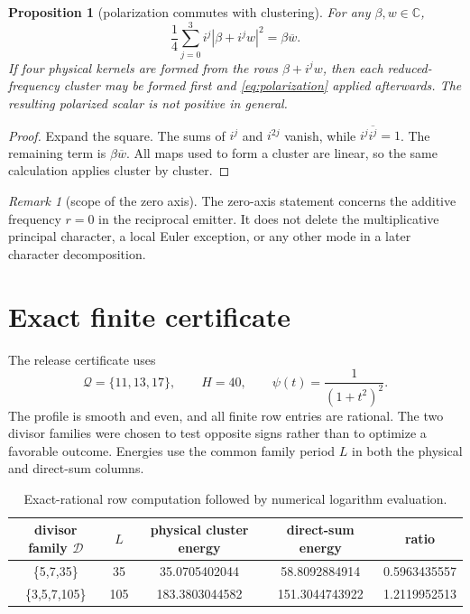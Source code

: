 \documentclass[11pt]{article}
\newtheorem{proposition}[theorem]{Proposition}
\theoremstyle{definition}
\theoremstyle{remark}
\newtheorem{remark}[theorem]{Remark}
\newcommand{\CC}{\mathbb C}
\newcommand{\Dd}{\mathcal D}
\newcommand{\QQ}{\mathcal Q}
\begin{document}
\begin{proposition}[polarization commutes with clustering]
\label{prop:polarization}
For any $\beta,w\in\CC$,
\begin{equation}
 \frac14\sum_{j=0}^3 i^j|\beta+i^jw|^2=\beta\overline w.
 \label{eq:polarization}
\end{equation}
If four physical kernels are formed from the rows
$\beta+i^jw$, then each reduced-frequency cluster may be formed first and
\eqref{eq:polarization} applied afterwards.  The resulting polarized scalar is
not positive in general.
\end{proposition}

\begin{proof}
Expand the square.  The sums of $i^j$ and $i^{2j}$ vanish, while
$i^j\overline{i^j}=1$.  The remaining term is $\beta\overline w$.  All maps
used to form a cluster are linear, so the same calculation applies cluster by
cluster.
\end{proof}

\begin{remark}[scope of the zero axis]
The zero-axis statement concerns the additive frequency $r=0$ in the reciprocal
emitter.  It does not delete the multiplicative principal character, a local
Euler exception, or any other mode in a later character decomposition.
\end{remark}

\section{Exact finite certificate}

The release certificate uses
\begin{equation}
 \QQ=\{11,13,17\},\qquad H=40,
 \qquad \psi(t)=\frac{1}{(1+t^2)^2}.
 \label{eq:fixture}
\end{equation}
The profile is smooth and even, and all finite row entries are rational.  The
two divisor families were chosen to test opposite signs rather than to optimize
a favorable outcome.  Energies use the common family period $L$ in both the
physical and direct-sum columns.

\begin{table}[t]
\centering
\caption{Exact-rational row computation followed by numerical logarithm evaluation.}
\label{tab:certificate}
\begin{tabular}{c|c|c|c|c}
\toprule
divisor family $\Dd$ & $L$ & physical cluster energy & direct-sum energy & ratio \\
\midrule
\{5,7,35\} & 35 & 35.0705402044 & 58.8092884914 & 0.5963435557 \\
\{3,5,7,105\} & 105 & 183.3803044582 & 151.3044743922 & 1.2119952513 \\
\bottomrule
\end{tabular}
\end{table}
\end{document}
